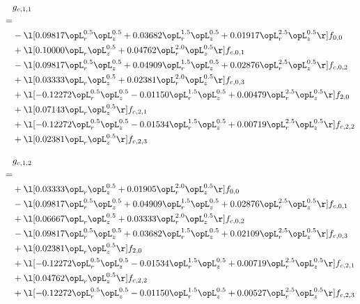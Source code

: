 \begin{alignat}{2} 
\label{eq:g_11_0} 
& g_{c,1,1} \nonumber \\ 
 = \\ 
& - \l[  0.09817 \opL_r^{0.5} \opL_z^{0.5} +  0.03682 \opL_r^{1.5} \opL_z^{0.5} +  0.01917 \opL_r^{2.5} \opL_z^{0.5}  \r] f_{0,0} \nonumber \\ 
& + \l[  0.10000 \opL_r \opL_z^{0.5} +  0.04762 \opL_r^{2.0} \opL_z^{0.5}  \r] f_{c,0,1} \nonumber \\ 
& - \l[  0.09817 \opL_r^{0.5} \opL_z^{0.5} +  0.04909 \opL_r^{1.5} \opL_z^{0.5} +  0.02876 \opL_r^{2.5} \opL_z^{0.5}  \r] f_{c,0,2} \nonumber \\ 
& + \l[  0.03333 \opL_r \opL_z^{0.5} +  0.02381 \opL_r^{2.0} \opL_z^{0.5}  \r] f_{c,0,3} \nonumber \\ 
& + \l[  -0.12272 \opL_r^{0.5} \opL_z^{0.5}   -0.01150 \opL_r^{1.5} \opL_z^{0.5} +  0.00479 \opL_r^{2.5} \opL_z^{0.5}  \r] f_{2,0} \nonumber \\ 
& + \l[  0.07143 \opL_r \opL_z^{0.5}  \r] f_{c,2,1} \nonumber \\ 
& + \l[  -0.12272 \opL_r^{0.5} \opL_z^{0.5}   -0.01534 \opL_r^{1.5} \opL_z^{0.5} +  0.00719 \opL_r^{2.5} \opL_z^{0.5}  \r] f_{c,2,2} \nonumber \\ 
& + \l[  0.02381 \opL_r \opL_z^{0.5}  \r] f_{c,2,3} \nonumber \\ 
\end{alignat} 


\begin{alignat}{2} 
\label{eq:g_12_0} 
& g_{c,1,2} \nonumber \\ 
 = \\ 
& + \l[  0.03333 \opL_r \opL_z^{0.5} +  0.01905 \opL_r^{2.0} \opL_z^{0.5}  \r] f_{0,0} \nonumber \\ 
& - \l[  0.09817 \opL_r^{0.5} \opL_z^{0.5} +  0.04909 \opL_r^{1.5} \opL_z^{0.5} +  0.02876 \opL_r^{2.5} \opL_z^{0.5}  \r] f_{c,0,1} \nonumber \\ 
& + \l[  0.06667 \opL_r \opL_z^{0.5} +  0.03333 \opL_r^{2.0} \opL_z^{0.5}  \r] f_{c,0,2} \nonumber \\ 
& - \l[  0.09817 \opL_r^{0.5} \opL_z^{0.5} +  0.03682 \opL_r^{1.5} \opL_z^{0.5} +  0.02109 \opL_r^{2.5} \opL_z^{0.5}  \r] f_{c,0,3} \nonumber \\ 
& + \l[  0.02381 \opL_r \opL_z^{0.5}  \r] f_{2,0} \nonumber \\ 
& + \l[  -0.12272 \opL_r^{0.5} \opL_z^{0.5}   -0.01534 \opL_r^{1.5} \opL_z^{0.5} +  0.00719 \opL_r^{2.5} \opL_z^{0.5}  \r] f_{c,2,1} \nonumber \\ 
& + \l[  0.04762 \opL_r \opL_z^{0.5}  \r] f_{c,2,2} \nonumber \\ 
& + \l[  -0.12272 \opL_r^{0.5} \opL_z^{0.5}   -0.01150 \opL_r^{1.5} \opL_z^{0.5} +  0.00527 \opL_r^{2.5} \opL_z^{0.5}  \r] f_{c,2,3} \nonumber \\ 
\end{alignat} 


